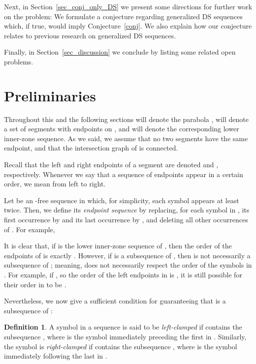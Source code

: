 \documentclass[11pt]{article}
\theoremstyle{definition}
\newtheorem{definition}[theorem]{Definition}
\theoremstyle{remark}
\begin{document}
Next, in Section~\ref{sec_conj_only_DS} we present some directions for further work on the problem: We formulate a conjecture regarding generalized DS sequences which, if true, would imply Conjecture~\ref{conj}. We also explain how our conjecture relates to previous research on generalized DS sequences.

Finally, in Section~\ref{sec_discussion} we conclude by listing some related open problems.

\section{Preliminaries}\label{sec_preliminaries}

Throughout this and the following sections  will denote the parabola ,  will denote a set of  segments with endpoints on , and  will denote the corresponding lower inner-zone sequence. As we said, we assume that no two segments have the same endpoint, and that the intersection graph of  is connected.

Recall that the left and right endpoints of a segment  are denoted  and , respectively. Whenever we say that a sequence of endpoints appear in a certain order, we mean from left to right.

Let  be an -free sequence in which, for simplicity, each symbol appears at least twice. Then, we define its \emph{endpoint sequence}  by replacing, for each symbol  in , its first occurrence by  and its last occurrence by , and deleting all other occurrences of . For example,


It is clear that, if  is the lower inner-zone sequence of , then the order of the endpoints of  is exactly . However, if  is a subsequence of , then  is not necessarily a subsequence of ; meaning,  does not necessarily respect the order of the symbols in . For example, if , so the order of the left endpoints in  is , it is still possible for their order in  to be .

Nevertheless, we now give a sufficient condition for guaranteeing that  is a subsequence of :

\begin{definition}\label{def_clamped}
A symbol  in a sequence  is said to be \emph{left-clamped} if  contains the subsequence , where  is the symbol immediately preceding the first  in . Similarly, the symbol  is \emph{right-clamped} if  contains the subsequence , where  is the symbol immediately following the last  in .
\end{definition}
\end{document}
